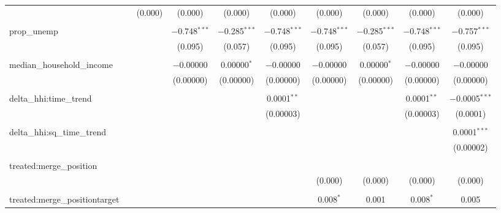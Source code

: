 \begin{table}[H]
{\begin{tabular}{@{\extracolsep{5pt}}lccccccccc}
   &  & (0.000) & (0.000) & (0.000) & (0.000) & (0.000) & (0.000) & (0.000) & (0.000) \\  

   & & & & & & & & & \\  

  prop\_unemp &  &  & $-$0.748$^{***}$ & $-$0.285$^{***}$ & $-$0.748$^{***}$ & $-$0.748$^{***}$ & $-$0.285$^{***}$ & $-$0.748$^{***}$ & $-$0.757$^{***}$ \\  

   &  &  & (0.095) & (0.057) & (0.095) & (0.095) & (0.057) & (0.095) & (0.095) \\  

   & & & & & & & & & \\  

  median\_household\_income &  &  & $-$0.00000 & 0.00000$^{*}$ & $-$0.00000 & $-$0.00000 & 0.00000$^{*}$ & $-$0.00000 & $-$0.00000 \\  

   &  &  & (0.00000) & (0.00000) & (0.00000) & (0.00000) & (0.00000) & (0.00000) & (0.00000) \\  

   & & & & & & & & & \\  

  delta\_hhi:time\_trend &  &  &  &  & 0.0001$^{**}$ &  &  & 0.0001$^{**}$ & $-$0.0005$^{***}$ \\  

   &  &  &  &  & (0.00003) &  &  & (0.00003) & (0.0001) \\  

   & & & & & & & & & \\  

  delta\_hhi:sq\_time\_trend &  &  &  &  &  &  &  &  & 0.0001$^{***}$ \\  

   &  &  &  &  &  &  &  &  & (0.00002) \\  

   & & & & & & & & & \\  

  treated:merge\_position &  &  &  &  &  &  &  &  &  \\  

   &  &  &  &  &  & (0.000) & (0.000) & (0.000) & (0.000) \\  

   & & & & & & & & & \\  

  treated:merge\_positiontarget &  &  &  &  &  & 0.008$^{*}$ & 0.001 & 0.008$^{*}$ & 0.005 \\  


\end{tabular}}
\end{table}
